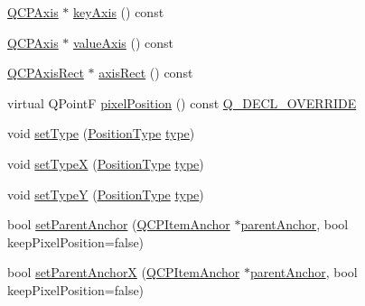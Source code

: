\begin{DoxyCompactItemize}
\item 
\mbox{\hyperlink{class_q_c_p_axis}{Q\+C\+P\+Axis}} $\ast$ \mbox{\hyperlink{class_q_c_p_item_position_a9ad34861fbfd8be8b8270c16f879169c}{key\+Axis}} () const
\item 
\mbox{\hyperlink{class_q_c_p_axis}{Q\+C\+P\+Axis}} $\ast$ \mbox{\hyperlink{class_q_c_p_item_position_a356ac94e7e73d88deb7f2841c0d0c734}{value\+Axis}} () const
\item 
\mbox{\hyperlink{class_q_c_p_axis_rect}{Q\+C\+P\+Axis\+Rect}} $\ast$ \mbox{\hyperlink{class_q_c_p_item_position_ae4081cfe7575f922f403c6e3a2ce7891}{axis\+Rect}} () const
\item 
virtual Q\+PointF \mbox{\hyperlink{class_q_c_p_item_position_a8be9a4787635433edecc75164beb748d}{pixel\+Position}} () const \mbox{\hyperlink{qcustomplot_8h_a42cc5eaeb25b85f8b52d2a4b94c56f55}{Q\+\_\+\+D\+E\+C\+L\+\_\+\+O\+V\+E\+R\+R\+I\+DE}}
\item 
void \mbox{\hyperlink{class_q_c_p_item_position_aa476abf71ed8fa4c537457ebb1a754ad}{set\+Type}} (\mbox{\hyperlink{class_q_c_p_item_position_aad9936c22bf43e3d358552f6e86dbdc8}{Position\+Type}} \mbox{\hyperlink{class_q_c_p_item_position_abfd74d86bd799306ce0295ffe433bdfc}{type}})
\item 
void \mbox{\hyperlink{class_q_c_p_item_position_a2113b2351d6d00457fb3559a4e20c3ea}{set\+TypeX}} (\mbox{\hyperlink{class_q_c_p_item_position_aad9936c22bf43e3d358552f6e86dbdc8}{Position\+Type}} \mbox{\hyperlink{class_q_c_p_item_position_abfd74d86bd799306ce0295ffe433bdfc}{type}})
\item 
void \mbox{\hyperlink{class_q_c_p_item_position_ac2a454aa5a54c1615c50686601ec4510}{set\+TypeY}} (\mbox{\hyperlink{class_q_c_p_item_position_aad9936c22bf43e3d358552f6e86dbdc8}{Position\+Type}} \mbox{\hyperlink{class_q_c_p_item_position_abfd74d86bd799306ce0295ffe433bdfc}{type}})
\item 
bool \mbox{\hyperlink{class_q_c_p_item_position_ac094d67a95d2dceafa0d50b9db3a7e51}{set\+Parent\+Anchor}} (\mbox{\hyperlink{class_q_c_p_item_anchor}{Q\+C\+P\+Item\+Anchor}} $\ast$\mbox{\hyperlink{class_q_c_p_item_position_a0a87f9dce1af6cc9b510785991bcf1c6}{parent\+Anchor}}, bool keep\+Pixel\+Position=false)
\item 
bool \mbox{\hyperlink{class_q_c_p_item_position_add71461a973927c74e42179480916d9c}{set\+Parent\+AnchorX}} (\mbox{\hyperlink{class_q_c_p_item_anchor}{Q\+C\+P\+Item\+Anchor}} $\ast$\mbox{\hyperlink{class_q_c_p_item_position_a0a87f9dce1af6cc9b510785991bcf1c6}{parent\+Anchor}}, bool keep\+Pixel\+Position=false)
\item 

\end{DoxyCompactItemize}

